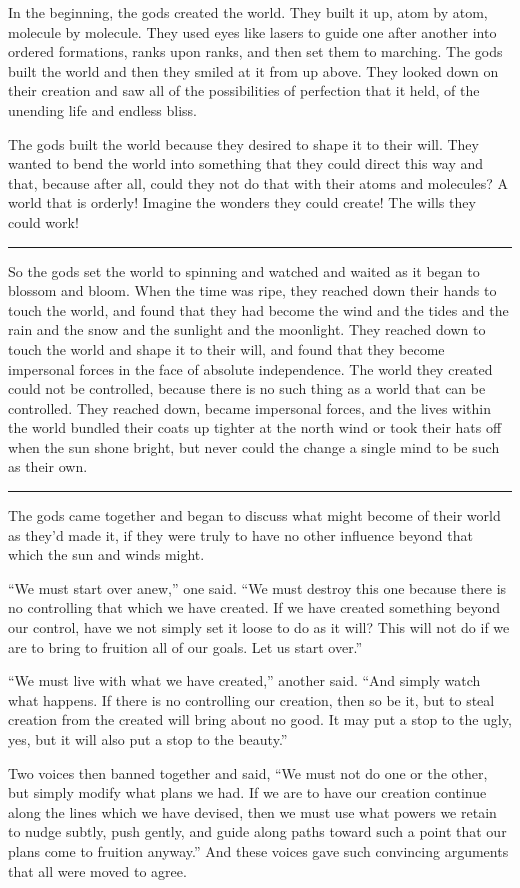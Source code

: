In the beginning, the gods created the world. They built it up, atom by atom, molecule by molecule. They used eyes like lasers to guide one after another into ordered formations, ranks upon ranks, and then set them to marching. The gods built the world and then they smiled at it from up above. They looked down on their creation and saw all of the possibilities of perfection that it held, of the unending life and endless bliss.

The gods built the world because they desired to shape it to their will. They wanted to bend the world into something that they could direct this way and that, because after all, could they not do that with their atoms and molecules? A world that is orderly! Imagine the wonders they could create! The wills they could work!

\begin{center}\rule{0.5\linewidth}{0.5pt}\end{center}

So the gods set the world to spinning and watched and waited as it began to blossom and bloom. When the time was ripe, they reached down their hands to touch the world, and found that they had become the wind and the tides and the rain and the snow and the sunlight and the moonlight. They reached down to touch the world and shape it to their will, and found that they become impersonal forces in the face of absolute independence. The world they created could not be controlled, because there is no such thing as a world that can be controlled. They reached down, became impersonal forces, and the lives within the world bundled their coats up tighter at the north wind or took their hats off when the sun shone bright, but never could the change a single mind to be such as their own.

\begin{center}\rule{0.5\linewidth}{0.5pt}\end{center}

The gods came together and began to discuss what might become of their world as they'd made it, if they were truly to have no other influence beyond that which the sun and winds might.

``We must start over anew,'' one said. ``We must destroy this one because there is no controlling that which we have created. If we have created something beyond our control, have we not simply set it loose to do as it will? This will not do if we are to bring to fruition all of our goals. Let us start over.''

``We must live with what we have created,'' another said. ``And simply watch what happens. If there is no controlling our creation, then so be it, but to steal creation from the created will bring about no good. It may put a stop to the ugly, yes, but it will also put a stop to the beauty.''

Two voices then banned together and said, ``We must not do one or the other, but simply modify what plans we had. If we are to have our creation continue along the lines which we have devised, then we must use what powers we retain to nudge subtly, push gently, and guide along paths toward such a point that our plans come to fruition anyway.'' And these voices gave such convincing arguments that all were moved to agree.
